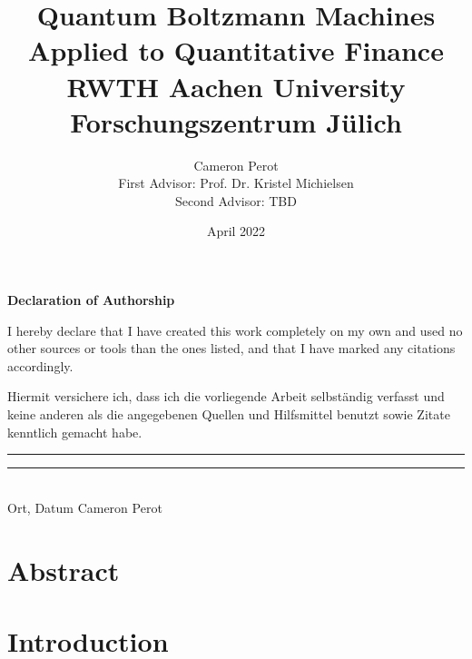 \documentclass[12pt,twoside]{report}
\title{
    {Quantum Boltzmann Machines Applied to Quantitative Finance}\\
    \vspace{0.5cm}
    {\large RWTH Aachen University}\\
    {\large Forschungszentrum J\"ulich}
}
\author{
    {Cameron Perot}\\
    {First Advisor: Prof. Dr. Kristel Michielsen}\\
    {Second Advisor: TBD}
}
\date{April 2022}
\begin{document}
\maketitle
{}

\clearpage\shipout\null
\begin{center}
\bf{Declaration of Authorship}
\end{center}

I hereby declare that I have created this work completely on my own and used no other sources or tools than the ones listed, and that I have marked any citations accordingly.

Hiermit versichere ich, dass ich die vorliegende Arbeit selbst\"andig verfasst und keine anderen als die angegebenen Quellen und Hilfsmittel benutzt sowie Zitate kenntlich gemacht habe. \\

\vspace{1.2cm}
\noindent \rule{5cm}{0.15mm} \hfill \rule{5cm}{0.15mm}\\
\noindent Ort, Datum \hfill Cameron Perot

\clearpage\shipout\null
\chapter*{Abstract}

\tableofcontents

\chapter{Introduction}
\label{ch:introduction}


\end{document}

